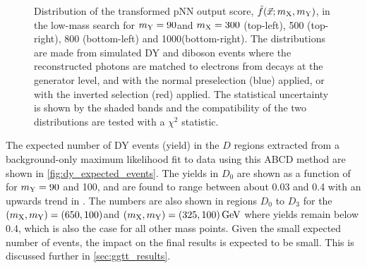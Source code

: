 \begin{figure}
  \caption[Correlation Check for the DY ABCD Method]{Distribution of the transformed pNN output score, $\tilde{f}(\vec{x};m_{\mathrm{X}},m_{\mathrm{Y}})$, in the low-mass \XYggHtt search for $m_{\mathrm{Y}}=90$\GeV and $m_{\mathrm{X}}=300$ (top-left), 500 (top-right), 800 (bottom-left) and 1000\GeV (bottom-right). The distributions are made from simulated DY and diboson events where the reconstructed photons are  matched to electrons from \Zee decays at the generator level, and with the normal preselection (blue) applied, or with the inverted selection (red) applied. The statistical uncertainty is shown by the shaded bands and the compatibility of the two distributions are tested with a $\chi^2$ statistic.}\label{fig:dy_correlation_check}
\end{figure}

The expected number of DY events (yield) in the $D$ regions extracted from a background-only maximum likelihood fit to data using this ABCD method are shown in \cref{fig:dy_expected_events}. The yields in $D_0$ are shown as a function of \mX for $m_{\mathrm{Y}} = 90$ and 100\GeV, and are found to range between about 0.03 and 0.4 with an upwards trend in \mX. The numbers are also shown in regions $D_0$ to $D_3$ for the $(m_{\mathrm{X}}, m_{\mathrm{Y}})=(650,100)$\GeV and $(m_{\mathrm{X}}, m_{\mathrm{Y}}) = (325,100)\,\text{Ge\hspace{-.08em}V}$ where yields remain below 0.4, which is also the case for all other mass points. Given the small expected number of events, the impact on the final results is expected to be small. This is discussed further in \cref{sec:ggtt_results}.

